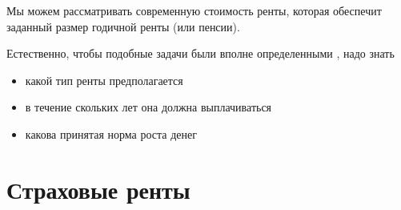 \begin{enumerate}
	\begin{remark}
		Мы можем рассматривать современную стоимость ренты, которая обеспечит заданный размер годичной ренты (или пенсии).

		Естественно, чтобы подобные задачи были вполне определенными , надо знать
		\begin{itemize}
			\item какой тип ренты предполагается
			\item в течение скольких лет она должна выплачиваться 
			\item какова принятая норма роста денег
		\end{itemize}
	\end{remark}
\end{enumerate}

\section{Страховые ренты} %

